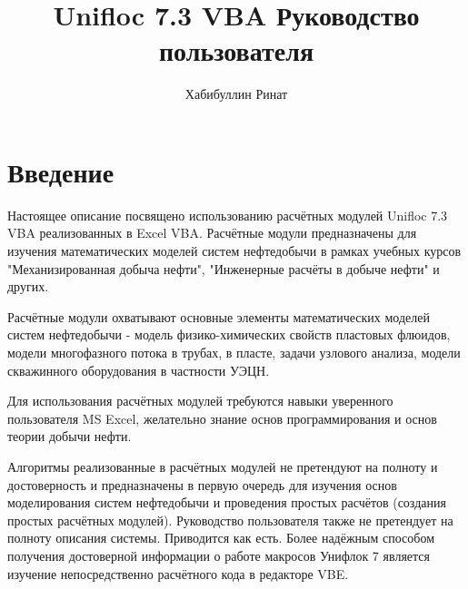 \documentclass[]{scrreprt}
\begin{document}
\newcommand{\unf}{Unifloc 7.3 VBA }

\newcommand{\putlisting}[1]{
	\tcbinputlisting{
		listing file=#1,
		minted language=vb.net,
		minted options={breaklines,fontsize=\small},%
		breakable,enhanced,%
		listing only
		}
}







\title{\unf Руководство пользователя}
\author{Хабибуллин Ринат}

\maketitle

\tableofcontents

\chapter{Введение}

Настоящее описание посвящено использованию расчётных модулей \unf реализованных в Excel VBA. Расчётные модули предназначены для изучения математических моделей систем нефтедобычи в рамках учебных курсов "Механизированная добыча нефти", "Инженерные расчёты в добыче нефти" и других.

Расчётные модули охватывают основные элементы математических моделей систем нефтедобычи - модель физико-химических свойств пластовых флюидов, модели многофазного потока в трубах, в пласте, задачи узлового анализа, модели скважинного оборудования в частности УЭЦН.  

Для использования расчётных модулей требуются навыки уверенного пользователя MS Excel, желательно знание основ программирования и основ теории добычи нефти. 

Алгоритмы реализованные в расчётных модулей не претендуют на полноту и достоверность и предназначены в первую очередь для изучения основ моделирования систем нефтедобычи и проведения простых расчётов (создания простых расчётных модулей). Руководство пользователя также не претендует на полноту описания системы. Приводится как есть. Более надёжным способом получения достоверной информации о работе макросов Унифлок 7 является изучение непосредственно расчётного кода в редакторе VBE.
\end{document}
